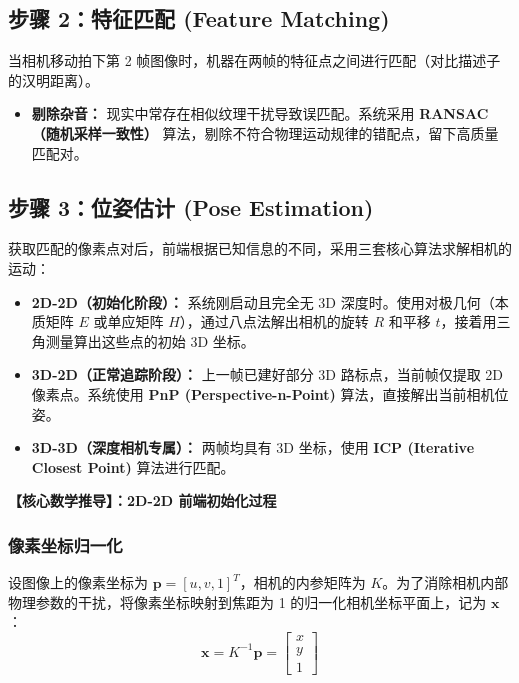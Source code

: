 \documentclass[12pt,a4paper]{article}
\begin{document}
\subsection{步骤 2：特征匹配 (Feature Matching)}
当相机移动拍下第 2 帧图像时，机器在两帧的特征点之间进行匹配（对比描述子的汉明距离）。
\begin{itemize}
    \item \textbf{剔除杂音：} 现实中常存在相似纹理干扰导致误匹配。系统采用 \textbf{RANSAC（随机采样一致性）} 算法，剔除不符合物理运动规律的错配点，留下高质量匹配对。
\end{itemize}

\subsection{步骤 3：位姿估计 (Pose Estimation)}
获取匹配的像素点对后，前端根据已知信息的不同，采用三套核心算法求解相机的运动：
\begin{itemize}
    \item \textbf{2D-2D（初始化阶段）：} 系统刚启动且完全无 3D 深度时。使用对极几何（本质矩阵 $E$ 或单应矩阵 $H$），通过八点法解出相机的旋转 $R$ 和平移 $t$，接着用三角测量算出这些点的初始 3D 坐标。
    \item \textbf{3D-2D（正常追踪阶段）：} 上一帧已建好部分 3D 路标点，当前帧仅提取 2D 像素点。系统使用 \textbf{PnP (Perspective-n-Point)} 算法，直接解出当前相机位姿。
    \item \textbf{3D-3D（深度相机专属）：} 两帧均具有 3D 坐标，使用 \textbf{ICP (Iterative Closest Point)} 算法进行匹配。
\end{itemize}

\vspace{0.3cm}
\textbf{【核心数学推导】：2D-2D 前端初始化过程}

\subsubsection{像素坐标归一化}
设图像上的像素坐标为 $\mathbf{p} = [u, v, 1]^T$，相机的内参矩阵为 $K$。为了消除相机内部物理参数的干扰，将像素坐标映射到焦距为 1 的归一化相机坐标平面上，记为 $\mathbf{x}$：
\begin{equation}
    \mathbf{x} = K^{-1} \mathbf{p} = \begin{bmatrix} x \\ y \\ 1 \end{bmatrix}
\end{equation}
\end{document}
